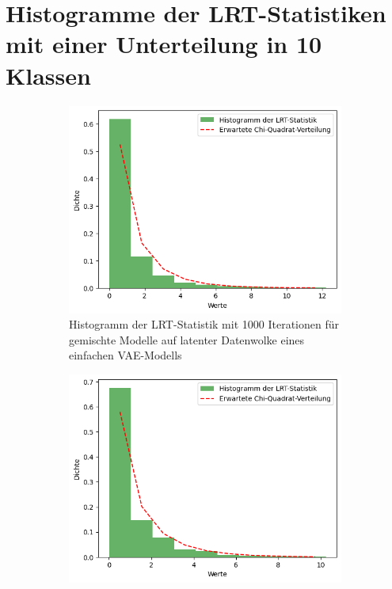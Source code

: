 \documentclass[%
thesis=student,%
coverpage=false,%
titlepage=false,%
headmarks=true, %
german,%
font=libertine, %
math=newpxtx, %
BCOR=5mm,%
coverBCOR=11mm%
]{tumbook}
\theoremstyle{break}
\begin{document}
\section{Histogramme der LRT-Statistiken mit einer Unterteilung in 10 Klassen}
\begin{figure}[H]
	\centering
	\begin{subfigure}[b]{0.45\textwidth}
		\centering
		\includegraphics[width=\textwidth]{plots/1_latent_dim_VAE_10bins.png}
		\caption{Histogramm der LRT-Statistik mit 1000 Iterationen für gemischte Modelle auf latenter Datenwolke eines einfachen VAE-Modells}
		\label{fig:HIST_1latent_dim_10bins}
	\end{subfigure}
	\hfill
	\begin{subfigure}[b]{0.45\textwidth}
		\centering
		\includegraphics[width=\textwidth]{plots/Autoencoder_10bins.png}

\end{subfigure}
\end{figure}
\end{document}
